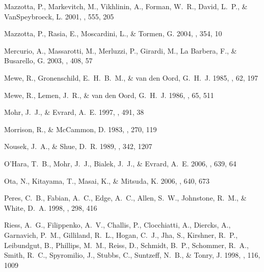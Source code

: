 \documentclass[12pt,preprint]{aastex}
\begin{document}
\begin{thebibliography}{83}
{Mazzotta}, P., {Markevitch}, M., {Vikhlinin}, A., {Forman}, W.~R., {David},
  L.~P., \& {VanSpeybroeck}, L. 2001, \apj, 555, 205

{Mazzotta}, P., {Rasia}, E., {Moscardini}, L., \& {Tormen}, G. 2004, \mnras,
  354, 10

{Mercurio}, A., {Massarotti}, M., {Merluzzi}, P., {Girardi}, M., {La Barbera},
  F., \& {Busarello}, G. 2003, \aap, 408, 57

{Mewe}, R., {Gronenschild}, E.~H.~B.~M., \& {van den Oord}, G.~H.~J. 1985,
  \aaps, 62, 197

{Mewe}, R., {Lemen}, J.~R., \& {van den Oord}, G.~H.~J. 1986, \aaps, 65, 511

{Mohr}, J.~J., \& {Evrard}, A.~E. 1997, \apj, 491, 38

{Morrison}, R., \& {McCammon}, D. 1983, \apj, 270, 119

{Nousek}, J.~A., \& {Shue}, D.~R. 1989, \apj, 342, 1207

{O'Hara}, T.~B., {Mohr}, J.~J., {Bialek}, J.~J., \& {Evrard}, A.~E. 2006, \apj,
  639, 64

{Ota}, N., {Kitayama}, T., {Masai}, K., \& {Mitsuda}, K. 2006, \apj, 640, 673

{Peres}, C.~B., {Fabian}, A.~C., {Edge}, A.~C., {Allen}, S.~W., {Johnstone},
  R.~M., \& {White}, D.~A. 1998, \mnras, 298, 416

{Riess}, A.~G., {Filippenko}, A.~V., {Challis}, P., {Clocchiatti}, A.,
  {Diercks}, A., {Garnavich}, P.~M., {Gilliland}, R.~L., {Hogan}, C.~J., {Jha},
  S., {Kirshner}, R.~P., {Leibundgut}, B., {Phillips}, M.~M., {Reiss}, D.,
  {Schmidt}, B.~P., {Schommer}, R.~A., {Smith}, R.~C., {Spyromilio}, J.,
  {Stubbs}, C., {Suntzeff}, N.~B., \& {Tonry}, J. 1998, \aj, 116, 1009


\end{thebibliography}
\end{document}

